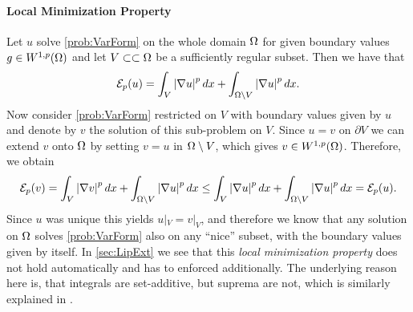 \paragraph*{Local Minimization Property} Let $u$ solve \cref{prob:VarForm} on the whole domain $\Omega$ for given boundary values $g\in W^{1,p}(\Omega)$ and let $V\subset\subset\Omega$ be a sufficiently regular subset. Then we have that
%
\begin{align*}
\mathcal{E}_p(u) = \int_{V} \left|\nabla u\right|^p dx + \int_{\Omega\setminus V} \left|\nabla u\right|^p dx.
\end{align*}
%
Now consider \cref{prob:VarForm} restricted on $V$ with boundary values given by $u$ and denote by $v$ the solution of this sub-problem on $V$. Since $u=v$ on $\partial V$ we can extend $v$ onto $\Omega$ by setting $v=u$ in $\Omega\setminus V$, which gives $v\in W^{1,p}(\Omega)$. Therefore, we obtain
%
\begin{align*}
\mathcal{E}_p(v) = \int_{V} \left|\nabla v\right|^p dx + \int_{\Omega\setminus V} \left|\nabla u\right|^p dx \leq 
\int_{V} \left|\nabla u\right|^p dx + \int_{\Omega\setminus V} \left|\nabla u\right|^p dx = \mathcal{E}_p(u).
\end{align*}
%
Since $u$ was unique this yields $u|_V = v|_V$, and therefore we know that any solution on $\Omega$ solves \cref{prob:VarForm} also on any \enquote{nice} subset, with the boundary values given by itself. In \cref{sec:LipExt} we see that this \textit{local minimization property} does not hold automatically and has to enforced additionally. The underlying reason here is, that integrals are set-additive, but suprema are not, which is similarly explained in \cite{aronsson2004tour}.

%
%
